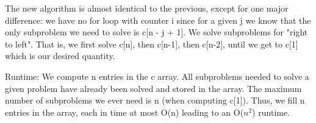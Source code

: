 \documentclass[11pt,a4paper]{article}
\begin{document}
The new algorithm is almost identical to the previous, except for one major difference: we have no for loop with counter i since for a given j we know that the only subproblem we need to solve is c[n - j + 1]. We solve subproblems for "right to left". That is, we first solve c[n], then c[n-1], then c[n-2], until we get to c[1] which is our desired quantity. 

Runtime:
We compute n entries in the c array. All subproblems needed to solve a given problem have already been solved and stored in the array. The maximum number of subproblems we ever need is n (when computing c[1]). Thus, we fill n entries in the array, each in time at most O(n) leading to an O($n^{2}$) runtime.
\end{document}
